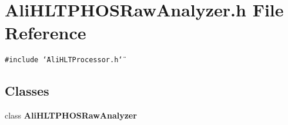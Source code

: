 \section{Ali\-HLTPHOSRaw\-Analyzer.h File Reference}
\label{AliHLTPHOSRawAnalyzer_8h}
{\tt \#include \char`\"{}Ali\-HLTProcessor.h\char`\"{}}\par
\subsection*{Classes}
\begin{CompactItemize}
\item 
class {\bf Ali\-HLTPHOSRaw\-Analyzer}
\end{CompactItemize}
